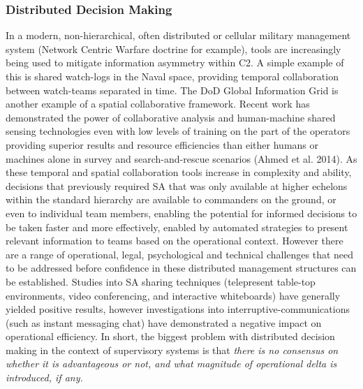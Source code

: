 \subsubsection{Distributed Decision Making}
In a modern, non-hierarchical, often distributed or cellular military management system (Network Centric Warfare doctrine for example), tools are increasingly being used to mitigate information asymmetry within C2. A simple example of this is shared watch-logs in the Naval space, providing temporal collaboration between watch-teams separated in time. The DoD Global Information Grid is another example of a spatial collaborative framework. Recent work has demonstrated the power of collaborative analysis and human-machine shared sensing technologies even with low levels of training on the part of the operators providing superior results and resource efficiencies than either humans or machines alone in survey and search-and-rescue scenarios (Ahmed et al. 2014).
As these temporal and spatial collaboration tools increase in complexity and ability, decisions that previously required SA that was only available at higher echelons within the standard hierarchy are available to commanders on the ground, or even to individual team members, enabling the potential for informed decisions to be taken faster and more effectively, enabled by automated strategies to present relevant information to teams based on the operational context.
However there are a range of operational, legal, psychological and technical challenges that need to be addressed before confidence in these distributed management structures can be established. Studies into SA sharing techniques (telepresent table-top environments, video conferencing, and interactive whiteboards) have generally yielded positive results, however investigations into interruptive-communications (such as instant messaging chat) have demonstrated a negative impact on operational efficiency.
In short, the biggest problem with distributed decision making in the context of supervisory systems is that \textit{there is no consensus on whether it is advantageous or not, and what magnitude of operational delta is introduced, if any.}

